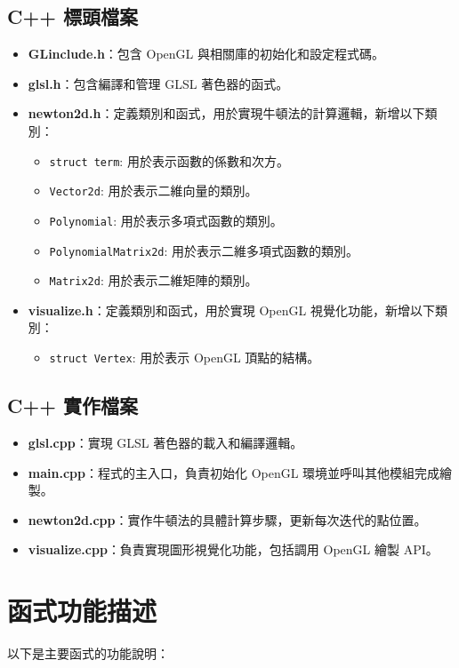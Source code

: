 \documentclass[a4paper,12pt]{article}
\begin{document}
\subsection{C++ 標頭檔案}
\begin{itemize}
    \item \textbf{GLinclude.h}：包含 OpenGL 與相關庫的初始化和設定程式碼。
    \item \textbf{glsl.h}：包含編譯和管理 GLSL 著色器的函式。
    \item \textbf{newton2d.h}：定義類別和函式，用於實現牛頓法的計算邏輯，新增以下類別：
    \begin{itemize}
        \item \texttt{struct term}: 用於表示函數的係數和次方。
        \item \texttt{Vector2d}: 用於表示二維向量的類別。
        \item \texttt{Polynomial}: 用於表示多項式函數的類別。
        \item \texttt{PolynomialMatrix2d}: 用於表示二維多項式函數的類別。
        \item \texttt{Matrix2d}: 用於表示二維矩陣的類別。
    \end{itemize}
    \item \textbf{visualize.h}：定義類別和函式，用於實現 OpenGL 視覺化功能，新增以下類別：
    \begin{itemize}
        \item \texttt{struct Vertex}: 用於表示 OpenGL 頂點的結構。
    \end{itemize}
\end{itemize}

\subsection{C++ 實作檔案}
\begin{itemize}
    \item \textbf{glsl.cpp}：實現 GLSL 著色器的載入和編譯邏輯。
    \item \textbf{main.cpp}：程式的主入口，負責初始化 OpenGL 環境並呼叫其他模組完成繪製。
    \item \textbf{newton2d.cpp}：實作牛頓法的具體計算步驟，更新每次迭代的點位置。
    \item \textbf{visualize.cpp}：負責實現圖形視覺化功能，包括調用 OpenGL 繪製 API。
\end{itemize}

\section{函式功能描述}
以下是主要函式的功能說明：
\end{document}
